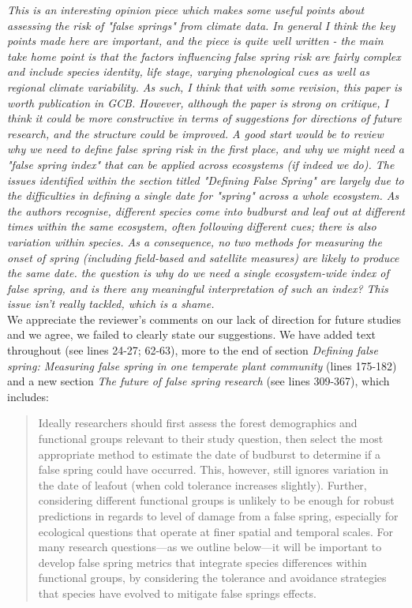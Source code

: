 \documentclass[11pt,a4paper]{article}
\begin{document}
\textit{This is an interesting opinion piece which makes some useful points about assessing the risk of "false springs" from climate data.  In general I think the key points made here are important, and the piece is quite well written - the main take home point is that the factors influencing false spring risk are fairly complex and include species identity, life stage, varying phenological cues as well as regional climate variability.  As such, I think that with some revision, this paper is worth publication in GCB. However, although the paper is strong on critique, I think it could be more constructive in terms of suggestions for directions of future research, and the structure could be improved.  A good start would be to review why we need to define false spring risk in the first place, and why we might need a "false spring index" that can be applied across ecosystems (if indeed we do).  The issues identified within the section titled "Defining False Spring" are largely due to the difficulties in defining a single date for "spring" across a whole ecosystem.  As the authors recognise, different species come into budburst and leaf out at different times within the same ecosystem, often following different cues; there is also variation within species.  As a consequence, no two methods for measuring the onset of spring (including field-based and satellite measures) are likely to produce the same date.  the question is why do we need a single ecosystem-wide index of false spring, and is there any meaningful interpretation of such an index?  This issue isn't really tackled, which is a shame. } \\

We appreciate the reviewer's comments on our lack of direction for future studies and we agree, we failed to clearly state our suggestions. We have added text throughout (see lines 24-27; 62-63),  more to the end of section \textit{Defining false spring: Measuring false spring in one temperate plant community} (lines 175-182) and a new section \textit{The future of false spring research} (see lines 309-367), which includes: \\ 

\begin{quotation}
Ideally researchers should first assess the forest demographics and functional groups relevant to their study question, then select the most appropriate method to estimate the date of budburst to determine if a false spring could have occurred. This, however, still ignores variation in the date of leafout (when cold tolerance increases slightly). Further, considering different functional groups is unlikely to be enough for robust predictions in regards to level of damage from a false spring, especially for ecological questions that operate at finer spatial and temporal scales. For many research questions---as we outline below---it will be important to develop false spring metrics that integrate species differences within functional groups, by considering the tolerance and avoidance strategies that species have evolved to mitigate false springs effects.
\end{quotation} 
\end{document}
